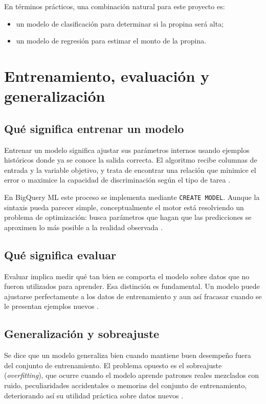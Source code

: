 \documentclass[12pt]{article}
\begin{document}
En términos prácticos, una combinación natural para este proyecto es:
\begin{itemize}[leftmargin=*]
\item un modelo de clasificación para determinar si la propina será alta;
\item un modelo de regresión para estimar el monto de la propina.
\end{itemize}

\section{Entrenamiento, evaluación y generalización}
\subsection{Qué significa entrenar un modelo}
Entrenar un modelo significa ajustar sus parámetros internos usando ejemplos históricos donde ya se conoce la salida correcta. El algoritmo recibe columnas de entrada y la variable objetivo, y trata de encontrar una relación que minimice el error o maximice la capacidad de discriminación según el tipo de tarea \cite{gcp_create_glm,google_logistic_loss}.

En BigQuery ML este proceso se implementa mediante \texttt{CREATE MODEL}. Aunque la sintaxis pueda parecer simple, conceptualmente el motor está resolviendo un problema de optimización: busca parámetros que hagan que las predicciones se aproximen lo más posible a la realidad observada \cite{gcp_create_glm}.

\subsection{Qué significa evaluar}
Evaluar implica medir qué tan bien se comporta el modelo sobre datos que no fueron utilizados para aprender. Esa distinción es fundamental. Un modelo puede ajustarse perfectamente a los datos de entrenamiento y aun así fracasar cuando se le presentan ejemplos nuevos \cite{gcp_bqml_eval_overview,google_overfitting}.

\subsection{Generalización y sobreajuste}
Se dice que un modelo generaliza bien cuando mantiene buen desempeño fuera del conjunto de entrenamiento. El problema opuesto es el sobreajuste (\textit{overfitting}), que ocurre cuando el modelo aprende patrones reales mezclados con ruido, peculiaridades accidentales o memorias del conjunto de entrenamiento, deteriorando así su utilidad práctica sobre datos nuevos \cite{google_overfitting}.
\end{document}
